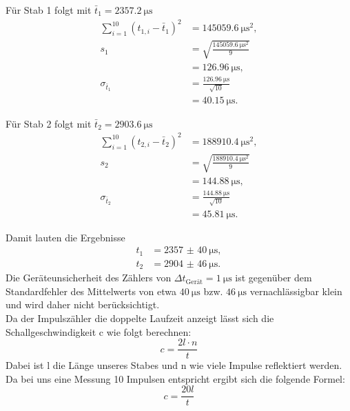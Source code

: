 Für Stab 1 folgt mit $\bar{t}_1 = \qty{2357.2}{\micro\second}$
\begin{align}
  \sum_{i=1}^{10} \left( t_{1,i} - \bar{t}_1 \right)^2
    &= \qty{145059.6}{\micro\second\squared}, \\[1ex]
  s_1 &= \sqrt{\frac{\qty{145059.6}{\micro\second\squared}}{9}} \nonumber \\
      &= \qty{126.96}{\micro\second}, \\[1ex]
  \sigma_{\bar{t}_1} &= \frac{\qty{126.96}{\micro\second}}{\sqrt{10}} \nonumber \\
      &= \qty{40.15}{\micro\second}.
\end{align}

Für Stab 2 folgt mit $\bar{t}_2 = \qty{2903.6}{\micro\second}$
\begin{align}
  \sum_{i=1}^{10} \left( t_{2,i} - \bar{t}_2 \right)^2
    &= \qty{188910.4}{\micro\second\squared}, \\[1ex]
  s_2 &= \sqrt{\frac{\qty{188910.4}{\micro\second\squared}}{9}} \nonumber \\
      &= \qty{144.88}{\micro\second}, \\[1ex]
  \sigma_{\bar{t}_2} &= \frac{\qty{144.88}{\micro\second}}{\sqrt{10}} \nonumber \\
      &= \qty{45.81}{\micro\second}.
\end{align}

Damit lauten die Ergebnisse
\begin{align}
  t_1 &= \qty{2357(40)}{\micro\second}, \\
  t_2 &= \qty{2904(46)}{\micro\second}.
\end{align}
Die Geräteunsicherheit des Zählers von $\Delta t_\text{Gerät} = \qty{1}{\micro\second}$ ist gegenüber dem Standardfehler des Mittelwerts von etwa $\qty{40}{\micro\second}$ bzw. $\qty{46}{\micro\second}$ vernachlässigbar klein und wird daher nicht berücksichtigt.\\

Da der Impulszähler die doppelte Laufzeit anzeigt lässt sich die Schallgeschwindigkeit c wie folgt berechnen:
\begin{equation}
  c = \frac{2l \cdot n}{t}
\end{equation}
Dabei ist l die Länge unseres Stabes und n wie viele Impulse reflektiert werden.
Da bei uns eine Messung 10 Impulsen entspricht ergibt sich die folgende Formel: 
\begin{equation}
  c = \frac{20l}{t}
  \label{eqn:Schall}
\end{equation}

